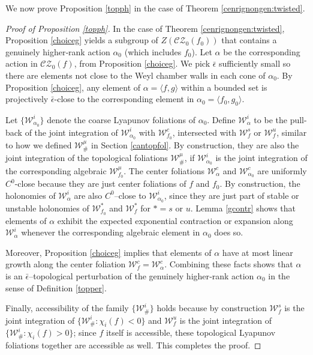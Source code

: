 \documentclass[11pt]{amsart}
\numberwithin{equation}{section}
\newcommand{\W}{\mathcal{W}}
\newcommand{\CZ}{\mathcal{CZ}}
\theoremstyle{plain}
\begin{document}
We now prove Proposition \ref{topph} in the case of Theorem \ref{cenrignongen:twisted}.
\begin{proof}[Proof of Proposition \ref{topph}]
In the case of Theorem \ref{cenrignongen:twisted}, Proposition
\ref{choiceg} yields a subgroup of $Z(\CZ_0(f_0))$ that contains a
genuinely higher‑rank action $\alpha_0$ (which includes $f_0$). Let
$\alpha$ be the corresponding action in
$\CZ_0(f)$, from Proposition
\ref{choiceg}. We pick $\bar\epsilon$ sufficiently small so there are elements not close to the Weyl chamber walls in each cone of $\alpha_0$. By Proposition \ref{choiceg}, any element of
$\alpha=\langle f,g\rangle$ within a bounded set is projectively $\bar\epsilon$-close to the
corresponding element in $\alpha_0=\langle f_0,g_0\rangle$. 

Let $\{\mathcal W^i_{\alpha_0}\}$ denote the coarse Lyapunov foliations of
$\alpha_0$. Define $\mathcal W^i_\alpha$ to be the pull-back of the joint integration of $\W^i_{\alpha_0}$ with $\W^c_{f_0}$, intersected with $\W^s_f$ or $\W^u_f$, similar to how we defined $\mathcal W^\mu_\#$ in Section
\ref{cantopfol}. By construction, they are also the joint integration of the
topological foliations $\mathcal W^\mu_\#$, if $\mathcal W^i_{\alpha_0}$ is the joint integration of the
corresponding algebraic $\mathcal W^\mu_{f_0}$. The center foliations $\W^c_\alpha$ and $\W^c_{\alpha_0}$ are uniformly $C^0$-close because they are just center foliations of $f$ and $f_0$. By construction, the holonomies of  $\mathcal W^i_\alpha$ are also $C^0$–close to $\mathcal W^i_{\alpha_0}$, since they are just part of stable or unstable holonomies of $\W^*_{f_0}$ and $\W^*_{f}$ for $*=s$ or $u$.
Lemma \ref{gcontr} shows that elements of $\alpha$ exhibit the
expected exponential contraction or expansion along $\mathcal W^i_\alpha$
whenever the corresponding algebraic element in $\alpha_0$ does so.

Moreover, Proposition \ref{choiceg} implies that elements of $\alpha$
have at most linear growth along the center foliation
$\mathcal W^c_f=\mathcal W^c_\alpha$. Combining these facts shows that
$\alpha$ is an $\bar\epsilon$–topological perturbation of the genuinely
higher‑rank action $\alpha_0$ in the sense of Definition \ref{topper}.

Finally, accessibility of the family $\{\mathcal W^i_\#\}$ holds because
by construction $\mathcal W^s_f$ is the joint integration of $\{\mathcal W^i_\#:\chi_i(f)<0\}$ and $\mathcal W^u_f$
is the joint integration of $\{\mathcal W^i_\#:\chi_i(f)>0\}$; since $f$ itself is accessible, these
topological Lyapunov foliations together are accessible as well. This completes
the proof.
\end{proof}
\end{document}
